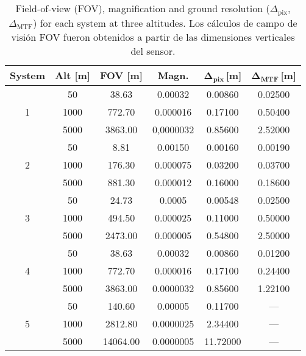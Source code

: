\begin{table}[h]
    \centering
    \footnotesize
    \setlength{\tabcolsep}{6pt}
    \caption{Field‑of‑view (FOV), magnification and ground resolution 
             (\(\Delta_\text{pix}\), \(\Delta_\text{MTF}\)) for each system
             at three altitudes. Los cálculos de campo de visión FOV fueron obtenidos a partir de las dimensiones verticales del sensor.}
    \label{tab:grd_fov_clean}
    \begin{tabular}{|c|c|c|c|c|c|}
        \hline
        \rowcolor[HTML]{EFEFEF}
        \textbf{System} & \textbf{Alt [m]} & \textbf{FOV [m]} & 
        \textbf{Magn.} & \(\boldsymbol{\Delta_\text{pix}}\)\,[m] & 
        \(\boldsymbol{\Delta_\text{MTF}}\)\,[m] \\ 
        \hline
        
        \multirow{3}{*}{1} 
         & 50   & 38.63  & 0.00032   & 0.00860  & 0.02500   \\ 
         & 1000 & 772.70 & 0.000016   & 0.17100  & 0.50400   \\ 
         & 5000 & 3863.00& 0,0000032   & 0.85600  & 2.52000   \\ 
        \hline
        
        \multirow{3}{*}{2}
         & 50   & 8.81   & 0.00150   & 0.00160  & 0.00190  \\ 
         & 1000 & 176.30 & 0.000075   & 0.03200  & 0.03700   \\ 
         & 5000 & 881.30 & 0.000012   & 0.16000  & 0.18600   \\ 
        \hline
        
        \multirow{3}{*}{3}
         & 50   & 24.73  & 0.0005   & 0.00548  & 0.02500   \\ 
         & 1000 & 494.50 & 0.000025   & 0.11000  & 0.50000   \\ 
         & 5000 & 2473.00& 0.000005   & 0.54800  & 2.50000   \\ 
        \hline
        
        \multirow{3}{*}{4}
         & 50   & 38.63  & 0.00032   & 0.00860  & 0.01200   \\ 
         & 1000 & 772.70 & 0.000016   & 0.17100  & 0.24400   \\ 
         & 5000 & 3863.00& 0.0000032   & 0.85600  & 1.22100   \\ 
        \hline
        
        \multirow{3}{*}{5}
         & 50   & 140.60 & 0.00005   & 0.11700  & —         \\ 
         & 1000 & 2812.80& 0.0000025   & 2.34400  & —         \\ 
         & 5000 & 14064.00&0.0000005   & 11.72000 & —         \\ 
        \hline
        

\end{tabular}
\end{table}

